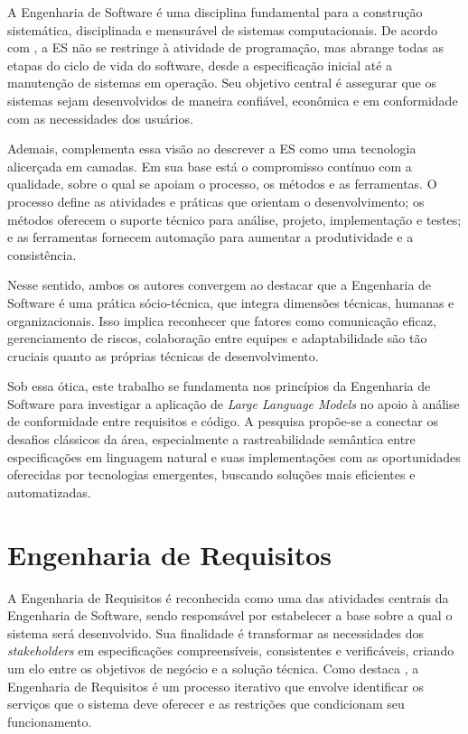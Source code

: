 
A Engenharia de Software é uma disciplina fundamental para a construção sistemática, disciplinada e mensurável de sistemas computacionais. De acordo com , a ES não se restringe à atividade de programação, mas abrange todas as etapas do ciclo de vida do software, desde a especificação inicial até a manutenção de sistemas em operação. Seu objetivo central é assegurar que os sistemas sejam desenvolvidos de maneira confiável, econômica e em conformidade com as necessidades dos usuários.

Ademais,  complementa essa visão ao descrever a ES como uma tecnologia alicerçada em camadas. Em sua base está o compromisso contínuo com a qualidade, sobre o qual se apoiam o processo, os métodos e as ferramentas. O processo define as atividades e práticas que orientam o desenvolvimento; os métodos oferecem o suporte técnico para análise, projeto, implementação e testes; e as ferramentas fornecem automação para aumentar a produtividade e a consistência.

Nesse sentido, ambos os autores convergem ao destacar que a Engenharia de Software é uma prática sócio-técnica, que integra dimensões técnicas, humanas e organizacionais. Isso implica reconhecer que fatores como comunicação eficaz, gerenciamento de riscos, colaboração entre equipes e adaptabilidade são tão cruciais quanto as próprias técnicas de desenvolvimento.

Sob essa ótica, este trabalho se fundamenta nos princípios da Engenharia de Software para investigar a aplicação de \textit{Large Language Models}  no apoio à análise de conformidade entre requisitos e código. A pesquisa propõe-se a conectar os desafios clássicos da área, especialmente a rastreabilidade semântica entre especificações em linguagem natural e suas implementações com as oportunidades oferecidas por tecnologias emergentes, buscando soluções mais eficientes e automatizadas.

\section{Engenharia de Requisitos}

A Engenharia de Requisitos é reconhecida como uma das atividades centrais da Engenharia de Software, sendo responsável por estabelecer a base sobre a qual o sistema será desenvolvido. Sua finalidade é transformar as necessidades dos \textit{stakeholders} em especificações compreensíveis, consistentes e verificáveis, criando um elo entre os objetivos de negócio e a solução técnica. Como destaca , a Engenharia de Requisitos é um processo iterativo que envolve identificar os serviços que o sistema deve oferecer e as restrições que condicionam seu funcionamento.

